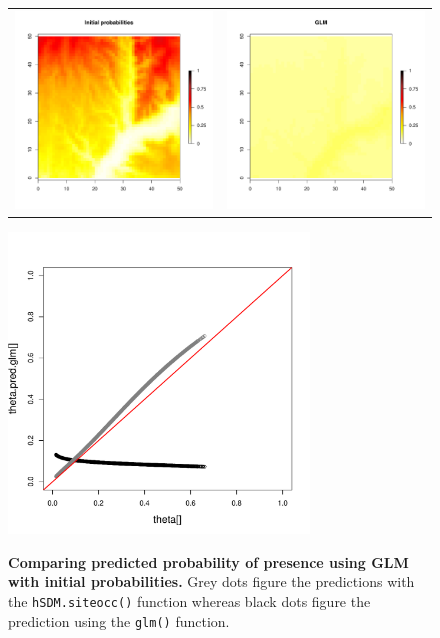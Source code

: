 \documentclass[a4paper, 12pt, leqno]{article}\usepackage[]{graphicx}\usepackage[]{color}
\begin{document}
\begin{figure} 
  \begin{tabular}{cc}
    \includegraphics[width=8cm]{figures/theta-binomial.pdf} &
    \includegraphics[width=8cm]{figures/predictions-siteocc-glm.pdf} \\
  \end{tabular}
  \centering \includegraphics[width=8cm]{figures/pred-obs-siteocc-glm.pdf} \\
  
  \caption{\textbf{Comparing predicted probability of presence using GLM with initial
      probabilities.} Grey dots figure the predictions with the \texttt{hSDM.siteocc()}
    function whereas black dots figure the prediction using the \texttt{glm()} function.}
  
  \label{fig:predictions-siteocc-glm}
  
\end{figure}
\end{document}
